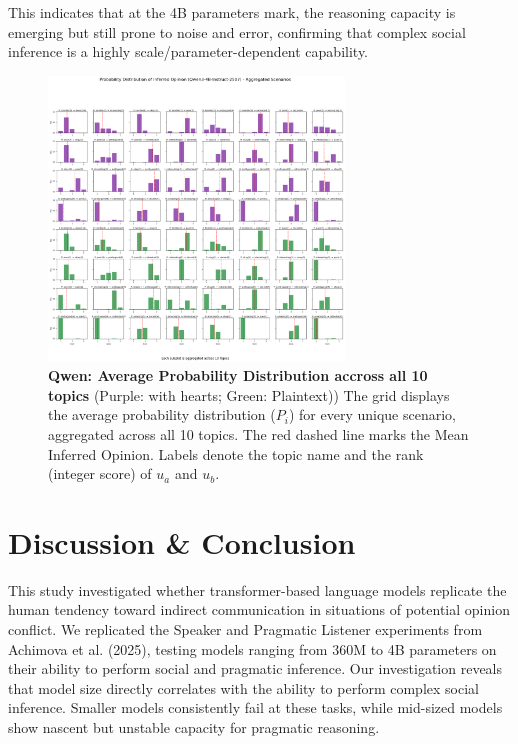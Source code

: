 \documentclass[11pt]{article}
\begin{document}
This indicates that at the 4B parameters mark, the reasoning capacity is emerging but still prone to noise and error, confirming that complex social inference is a highly scale/parameter-dependent capability.

\begin{figure}[t] %
    \centering
    \includegraphics[width=0.7\textwidth]{plots/qwen_log_prob.png}
    \caption{\textbf{Qwen: Average Probability Distribution accross all 10 topics}
    (Purple: with hearts; Green: Plaintext))
    The grid displays the average probability distribution ($P_i$) for every unique scenario, aggregated across all 10 topics. The red dashed line marks the Mean Inferred Opinion. Labels denote the topic name and the rank (integer score) of $u_a$ and $u_b$. }
    \label{fig:qwen-log-prob}
\end{figure}


\section{Discussion \& Conclusion}

This study investigated whether transformer-based language models replicate the human tendency toward indirect communication in situations of potential opinion conflict. We replicated the Speaker and Pragmatic Listener experiments from Achimova et al. (2025), testing models ranging from 360M to 4B parameters on their ability to perform social and pragmatic inference.
Our investigation reveals that model size directly correlates with the ability to perform complex social inference. Smaller models consistently fail at these tasks, while mid-sized models show nascent but unstable capacity for pragmatic reasoning.
\end{document}
